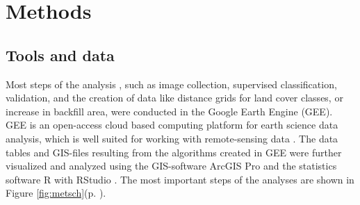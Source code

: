 \documentclass[11pt, A4, oneside]{report}
\begin{document}
\newpage
\chapter{Methods}
\section{Tools and data}
Most steps of the analysis , such as image collection, supervised classification, validation, and the creation of data like distance grids for land cover classes, or increase in backfill area, were conducted in the Google Earth Engine (GEE). GEE is an open-access cloud based computing platform for earth science data analysis, which is well suited for working with remote-sensing data \parencite{Gorelick.2017}. The data tables and GIS-files resulting from the algorithms created in GEE were further visualized and analyzed using the GIS-software ArcGIS Pro and the statistics software R with RStudio \parencite{baseR,studioR}. The most important steps of the analyses are shown in Figure \ref{fig:metsch}(p. \pageref{fig:metsch}).\\ 
\end{document}
